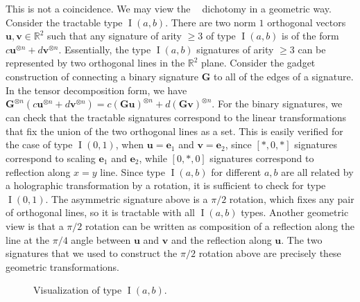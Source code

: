 \documentclass[11pt]{article}
\DeclareMathOperator{\holbs}{Holant^*_2}
\DeclareMathOperator{\typei}{I}
\begin{document}
This is not a coincidence.
We may view the $\holbs$ dichotomy in a geometric way.
Consider the tractable type $\typei(a, b)$.
There are two norm $1$ orthogonal vectors $\mathbf{u}, \mathbf{v} \in \mathbb{R}^2$ such that any signature of arity $\ge 3$ of  type $\typei(a, b)$
is of the form $c \mathbf{u}^{\otimes n} + d \mathbf{v}^{\otimes n}$.
Essentially, the type $\typei(a,b)$ signatures of arity $\ge 3$  
can be represented by two orthogonal lines in the $\mathbb{R}^2$ plane.
Consider the gadget construction of connecting a binary signature $\mathbf{G}$ to all of the edges of a signature.
In the tensor decomposition form, we have $\mathbf{G}^{\otimes n}(c \mathbf{u}^{\otimes n} + d \mathbf{v}^{\otimes n}) = c (\mathbf{G} \mathbf{u})^{\otimes n} + d (\mathbf{G} \mathbf{v})^{\otimes n}$.
For the binary signatures, we can check that the tractable signatures correspond to the linear transformations that fix the union of the two orthogonal lines as a set.
This is easily verified for the case of type $\typei(0, 1)$, when $\mathbf{u} = \mathbf{e}_1$ and $\mathbf{v} = \mathbf{e}_2$, since $[*, 0, *]$ signatures correspond to scaling $\mathbf{e}_1$ and $\mathbf{e}_2$, while $[0, *, 0]$ signatures correspond to reflection along $x = y$ line. 
Since type $\typei(a, b)$ for different $a, b$ are all related by a holographic transformation by a rotation, it is sufficient to check for type $\typei(0, 1)$.
The asymmetric signature above is a $\pi/2$ rotation, which fixes any pair of orthogonal lines, so it is tractable with all $\typei(a, b)$ types.
Another geometric view is that a $\pi/2$ rotation can be written as composition of a reflection along the line at the $\pi/4$ angle between $\mathbf{u}$ and $\mathbf{v}$ and the reflection along $\mathbf{u}$.
The two signatures that we used to construct the $\pi/2$ rotation above are precisely these geometric transformations.
\begin{figure}
  \centering
  \caption{Visualization of type $\typei(a, b)$.} \label{fig:type-i-geometric}
\end{figure}
\end{document}
